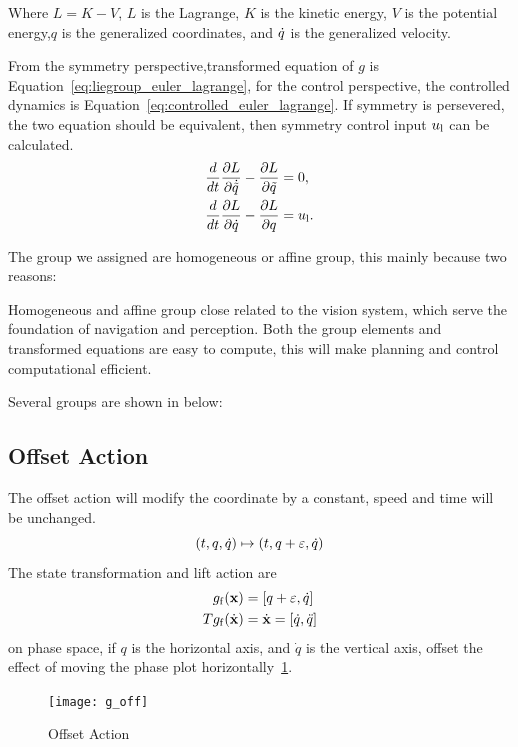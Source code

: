 Where $L=K-V$, $L$ is the Lagrange, $K$ is the kinetic energy, $V$ is the potential energy,$q$ is the generalized coordinates, and $\dot{q}$ is the generalized velocity.

From the symmetry perspective,transformed equation of $g$ is Equation~\ref{eq:liegroup_euler_lagrange}, for the control perspective, the controlled dynamics is Equation~\ref{eq:controlled_euler_lagrange}. If symmetry is persevered, the two equation should be equivalent, then symmetry control input $u_{\mathrm{l}}$ can be calculated.
\begin{align}
\frac{d}{dt} \frac{\partial L}{\partial \dot{\tilde{q}}} - \frac{\partial L}{\partial \tilde{q} }&=0,\label{eq:liegroup_euler_lagrange}\\
\frac{d}{dt} \frac{\partial L}{\partial \dot{q}} - \frac{\partial L}{\partial q}&=u_{\mathrm{l}}. \label{eq:controlled_euler_lagrange}
\end{align}





The group we assigned are homogeneous or affine group, this mainly because two reasons:
\begin{itemize}
 Homogeneous and affine group close related to the vision system, which serve the foundation of navigation and perception.
 Both the group elements and transformed equations are easy to compute, this will make planning and control  computational efficient.
\end{itemize}

Several groups are shown in below:

\subsection*{ Offset Action}
The offset action will modify the coordinate by a constant, speed and time will be unchanged.
\[
(t,q,\dot{q}) \mapsto (t,q+\varepsilon,\dot{q})
\]
The state transformation and lift action are
\begin{align}
g_{\mathrm{f}}(\mathbf{x}) &= [q+\varepsilon,\dot{q}] \\
Tg_{\mathrm{f}}(\dot{\mathbf{x}})&=\dot{\mathbf{x}}=[\dot{q},\ddot{q}]
\end{align}
on phase space, if $q$ is the horizontal axis, and $\dot{q}$ is the vertical axis, offset the effect of moving the phase plot horizontally~\ref{fig:goff}.

\begin{figure}[!htbp]
  \begin{center}
      \texttt{[image: g\_off]}
    \caption{Offset Action}
    \label{fig:goff}
\end{center}
\end{figure}

